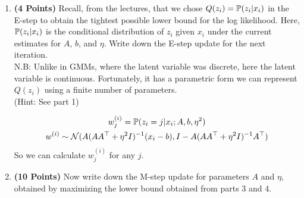 \begin{enumerate}
\item \textbf{(4 Points)}
Recall, from the lectures, that we chose
$Q(z_i) =  \mathbb{P}(z_i|x_i)$ in the E-step to obtain the tightest
possible lower bound for the log likelihood.
Here, $ \mathbb{P}(z_i|x_i)$ is the conditional distribution of $z_i$
given $x_i$ under the current estimates for $A$, $b$, and $\eta$.
Write down the E-step update for the next iteration. \\
N.B: Unlike in GMMs, where the latent variable was discrete, here the latent variable is continuous. Fortunately, it has a parametric form we can represent $Q(z_i)$ using a finite number of parameters. \\
(Hint: See part 1)

\begin{soln}
  \begin{gather*}
    w^{(i)}_j = \mathbb{P}(z_i = j \vert x_i; A, b, \eta^2) \\
    w^{(i)} \sim \mathcal{N}(A(AA^\top + \eta^2 I)^{-1}(x_i-b), I - A(AA^\top + \eta^2 I)^{-1}A^\top)
  \end{gather*}
  So we can calculate $w^{(i)}_j$ for any $j$.
\end{soln}

\item \textbf{(10 Points)}
Now write down the M-step update for parameters $A$ and $\eta$, obtained
by maximizing the lower bound obtained from parts 3 and 4.


\end{enumerate}
